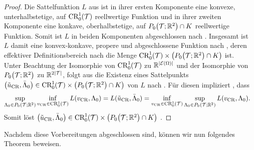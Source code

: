 \begin{proof}
  Die Sattelfunktion $L$ aus  ist in
  ihrer ersten Komponente eine konvexe, unterhalbstetige, auf $\textup{CR}^1_0(\mathcal{T})$
  reellwertige Funktion und
  in ihrer zweiten Komponente eine konkave, oberhalbstetige, auf
  $P_0\!\left(\mathcal{T};\mathbb{R}^2\right)\cap K$ reellwertige Funktion.
  Somit ist $L$ in beiden Komponenten abgeschlossen 
  nach \cite[S. 52, 308]{Roc70}.  
  Insgesamt ist $L$ damit eine konvex-konkave, propere und abgeschlossene
  Funktion nach \cite[S. 349, 362 f.]{Roc70}, deren effektiver
  Definitionsbereich nach \cite[362]{Roc70} die Menge $\textup{CR}^1_0(\mathcal{T})\times
  \left( P_0\!\left(\mathcal{T};\mathbb{R}^2\right)\cap K\right)$ ist.
  Unter Beachtung der Isomorphie von $\textup{CR}^1_0(\mathcal{T})$ zu
  $\mathbb{R}^{|\mathcal{E}(\Omega)|}$ und der Isomorphie von
  $P_0\!\left(\mathcal{T};\mathbb{R}^2\right)$ zu $\mathbb{R}^{2|\mathcal{T}|}$, folgt aus 
  \cite[S. 397, Theorem 37.6]{Roc70} die Existenz eines Sattelpunkts
  $\left(\tilde{u}_{\textup{CR}},\bar\Lambda_0\right)\in \textup{CR}^1_0(\mathcal{T})\times \left(
  P_0\!\left(\mathcal{T};\mathbb{R}^2\right)\cap K\right)$ von $L$ nach \cite[380]{Roc70}.
  Für diesen impliziert \cite[S. 380, Lemma 36.2]{Roc70}, dass 
  \begin{align*}
    \sup_{\Lambda_0\in P_0\left(\mathcal{T};\mathbb{R}^2\right)}\inf_{v_\textup{CR}\in\textup{CR}^1_0(\mathcal{T})}
    L(v_\textup{CR},\Lambda_0)
    =
    L(\tilde{u}_{\textup{CR}},\bar\Lambda_0) 
    = 
    \inf_{v_\textup{CR}\in\textup{CR}^1_0(\mathcal{T})}\sup_{\Lambda_0\in P_0\left(\mathcal{T};\mathbb{R}^2\right)}
    L(v_\textup{CR},\Lambda_0).
  \end{align*}
  Somit löst $\left(\tilde{u}_{\textup{CR}},\bar\Lambda_0\right)\in \textup{CR}^1_0(\mathcal{T})\times
  \left( P_0\!\left(\mathcal{T};\mathbb{R}^2\right)\cap K\right)$
  .
\end{proof}

Nachdem diese Vorbereitungen abgeschlossen sind, können wir nun folgendes
Theorem beweisen.

